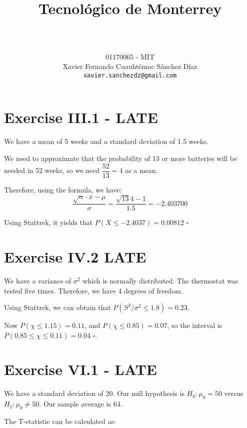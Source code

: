 \documentclass[titlepage, letterpaper]{article}
\title{
\vspace{1in}
\textbf{Tecnológico de Monterrey} \\
\vspace{0.5in}
\textmd{\mahclass} \\
\vspace{0.5in}
\textsc{\mahtitle}
\author{01170065  - MIT \\
Xavier Fernando Cuauhtémoc Sánchez Díaz \\
\texttt{xavier.sanchezdz@gmail.com}}
\date{\mahdate}
}
\newcommand{\qed}{\,\,\square}
\begin{document}
\begin{titlepage}
    \maketitle
\end{titlepage}

%
%

\section{Exercise III.1 - LATE} %
\label{sec:exercise_iii_1}
We have a mean of 5 weeks and a standard deviation of 1.5 weeks.

We need to approximate that the probability of 13 or more batteries will be needed in 52 weeks, so we need $\dfrac{52}{13} = 4$ as a mean.

Therefore, using the formula, we have:
$$\dfrac{\sqrt{n} \cdot \overline{x} - \mu}{\sigma} = \dfrac{\sqrt{13} 4 - 1}{1.5} = -2.403700$$

Using Stattrek, it yields that $P(X \leq -2.4037) = 0.00812 \qed$


\section{Exercise IV.2 LATE} %
\label{sec:exercise_iv_2}


We have a variance of $\sigma^2$ which is normally distributed.
The thermostat was tested five times.
Therefore, we have 4 degrees of freedom.

Using Stattrek, we can obtain that $P(S^2/\sigma^2 \leq 1.8) = 0.23$.

Now $P(\chi \leq 1.15) = 0.11$, and $P(\chi \leq 0.85) = 0.07$, so the interval is $P(0.85 \leq \chi \leq 0.11) = 0.04\qed$.

\section{Exercise VI.1 - LATE} %
\label{sec:exercise_vi_1}

We have a standard deviation of 20.
Our null hypothesis is $H_0 \colon \mu_0 = 50$ versus $H_1 \colon \mu_0 \not = 50$.
Our sample average is 64.

The T-statistic can be calculated as:
\end{document}
